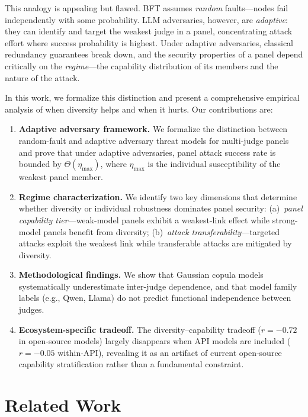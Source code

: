 \documentclass[11pt]{article}
\begin{document}
This analogy is appealing but flawed.
BFT assumes \emph{random} faults---nodes fail independently with some probability.
LLM adversaries, however, are \emph{adaptive}: they can identify and target the weakest judge in a panel, concentrating attack effort where success probability is highest.
Under adaptive adversaries, classical redundancy guarantees break down, and the security properties of a panel depend critically on the \emph{regime}---the capability distribution of its members and the nature of the attack.

In this work, we formalize this distinction and present a comprehensive empirical analysis of when diversity helps and when it hurts.
Our contributions are:

\begin{enumerate}
\item \textbf{Adaptive adversary framework.} We formalize the distinction between random-fault and adaptive adversary threat models for multi-judge panels and prove that under adaptive adversaries, panel attack success rate is bounded by $\Theta(\eta_{\max})$, where $\eta_{\max}$ is the individual susceptibility of the weakest panel member.

\item \textbf{Regime characterization.} We identify two key dimensions that determine whether diversity or individual robustness dominates panel security: (a)~\emph{panel capability tier}---weak-model panels exhibit a weakest-link effect while strong-model panels benefit from diversity; (b)~\emph{attack transferability}---targeted attacks exploit the weakest link while transferable attacks are mitigated by diversity.

\item \textbf{Methodological findings.} We show that Gaussian copula models systematically underestimate inter-judge dependence, and that model family labels (e.g., Qwen, Llama) do not predict functional independence between judges.

\item \textbf{Ecosystem-specific tradeoff.} The diversity--capability tradeoff ($r=-0.72$ in open-source models) largely disappears when API models are included ($r=-0.05$ within-API), revealing it as an artifact of current open-source capability stratification rather than a fundamental constraint.
\end{enumerate}

\section{Related Work}
\end{document}
